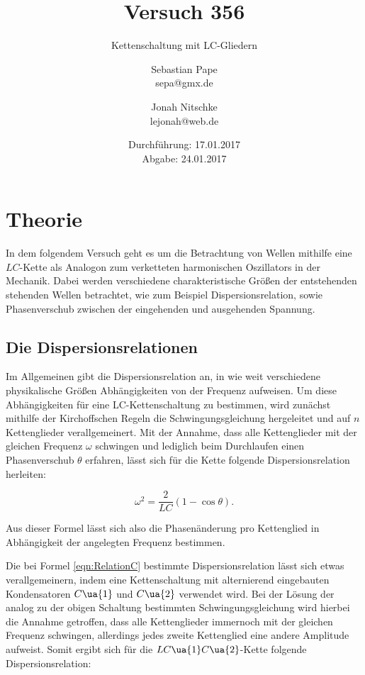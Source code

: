 

\title{Versuch 356}
\subtitle{Kettenschaltung mit LC-Gliedern}
\author{Sebastian Pape\\
        sepa@gmx.de \and
        Jonah Nitschke\\
        lejonah@web.de}
\date{Durchführung: 17.01.2017\\
      Abgabe: 24.01.2017}


\maketitle

\section{Theorie}

In dem folgendem Versuch geht es um die Betrachtung von Wellen mithilfe eine
$LC$-Kette als Analogon zum verketteten harmonischen Oszillators in der
Mechanik. Dabei werden verschiedene charakteristische Größen der entstehenden
stehenden Wellen betrachtet, wie zum Beispiel Dispersionsrelation, sowie Phasenverschub
zwischen der eingehenden und ausgehenden Spannung.


\subsection{Die Dispersionsrelationen}

Im Allgemeinen gibt die Dispersionsrelation an, in wie weit verschiedene physikalische
Größen Abhängigkeiten von der Frequenz aufweisen. Um diese Abhängigkeiten für
eine LC-Kettenschaltung zu bestimmen, wird zunächst mithilfe der Kirchoffschen
Regeln die Schwingungsgleichung hergeleitet und auf $n$ Kettenglieder verallgemeinert.
Mit der Annahme, dass alle Kettenglieder mit der gleichen Frequenz $\omega$ schwingen
und lediglich beim Durchlaufen einen Phasenverschub $\theta$ erfahren, lässt sich
für die Kette folgende Dispersionsrelation herleiten:

\begin{equation}
  \omega^2 = \frac{2}{LC}(1-\cos{\theta}) .
  \label{eqn:RelationC}
\end{equation}

Aus dieser Formel lässt sich also die Phasenänderung pro Kettenglied in Abhängigkeit
der angelegten Frequenz bestimmen.

Die bei Formel \eqref{eqn:RelationC} bestimmte Dispersionsrelation lässt
sich etwas verallgemeinern, indem eine Kettenschaltung  mit alternierend eingebauten
Kondensatoren $C\ua{1}$ und $C\ua{2}$ verwendet wird. Bei der Lösung der analog
zu der obigen Schaltung bestimmten Schwingungsgleichung wird hierbei die Annahme
getroffen, dass alle Kettenglieder immernoch mit der gleichen Frequenz schwingen,
allerdings jedes zweite Kettenglied eine andere Amplitude aufweist. Somit ergibt
sich für die $LC\ua{1}C\ua{2}$-Kette folgende Dispersionsrelation:

